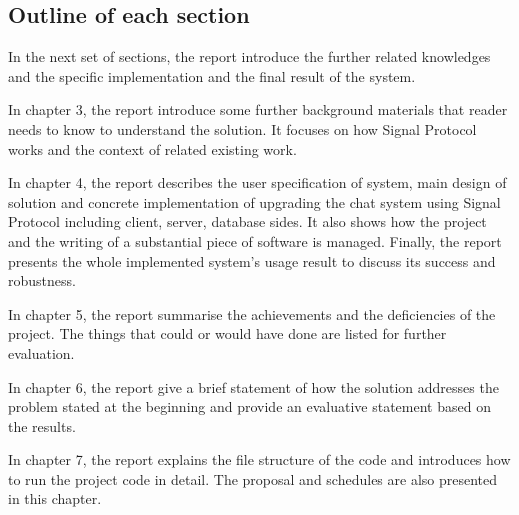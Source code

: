 \subsection{Outline of each section}
In the next set of sections, the report introduce the further related knowledges and the specific implementation and the final result of the system.

In chapter 3, the report introduce some further background materials that reader needs to know to understand the solution. It focuses on how Signal Protocol works and the context of related existing work.

In chapter 4, the report describes the user specification of system, main design of solution and concrete implementation of upgrading the chat system using Signal Protocol including client, server, database sides. It also shows how the project and the writing of a substantial piece of software is managed. Finally, the report presents the whole implemented system's usage result to discuss its success and robustness.

In chapter 5, the report summarise the achievements and the deficiencies of the project. The things that could or would have done are listed for further evaluation.

In chapter 6, the report give a brief statement of how the solution addresses the problem stated at the beginning and provide an evaluative statement based on the results.

In chapter 7, the report explains the file structure of the code and introduces how to run the project code in detail. The proposal and schedules are also presented in this chapter.

\clearpage